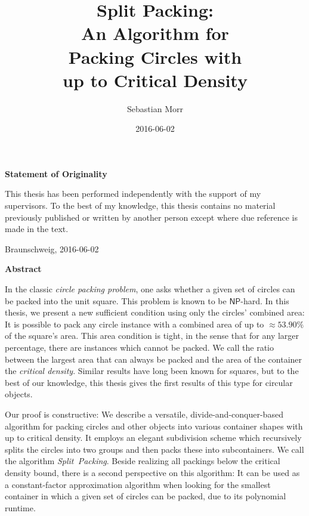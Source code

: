 \documentclass[a4paper,style=print,bibliography=totoc,nexus,lnum,extramargin]{tubsbook}
\title{Split Packing:\\ An Algorithm for\\ Packing Circles with\\ up to Critical Density}
\author{\sffamily\LARGE Sebastian Morr}
\date{\large 2016-06-02}
\begin{document}
\frontmatter

\maketitle

\thispagestyle{plain}
\cleardoublepage

\vspace*{7cm}
\centerline{\bfseries Statement of Originality}
\vspace*{1em}
\noindent
This thesis has been performed independently with the support of my supervisors.
To the best of my knowledge, this thesis contains no material previously
published or written by another person except where due reference is made in the text.

\par
  \bigskip\noindent Braunschweig, 2016-06-02 \par
  \vspace*{10mm}
  \hfill\hrulefill
\cleardoublepage

\thispagestyle{plain}
\centerline{\bfseries Abstract}
\vspace*{1em}
\noindent

In the classic \emph{circle packing problem}, one asks whether a given set of circles can be packed into the unit square. This problem is known to be $\mathsf{NP}$-hard.
In this thesis, we present a new sufficient condition using only the circles' combined area: It is possible to pack any circle instance with a combined area of up to $\approx \! 53.90\%$ of the square's area. This area condition is tight, in the sense that for any larger percentage, there are instances which cannot be packed. We call the ratio between the largest area that can always be packed and the area of the container the \emph{critical density}. Similar results have long been known for squares, but to the best of our knowledge, this thesis gives the first results of this type for circular objects.

Our proof is constructive: We describe a versatile, divide-and-conquer-based algorithm for packing circles and other objects into various container shapes with up to critical density. It employs an elegant subdivision scheme which recursively splits the circles into two groups and then packs these into subcontainers. We call the algorithm \emph{Split~Packing}.
Beside realizing all packings below the critical density bound, there is a second perspective on this algorithm: 
It can be used as a constant-factor approximation algorithm when looking for the smallest container in which a given set of circles can be packed, due to its polynomial runtime.
\end{document}
